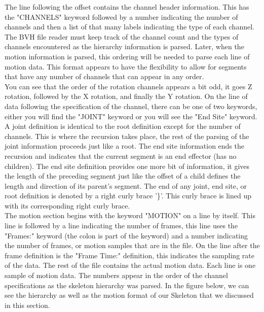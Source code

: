 The line following the offset contains the channel header information. This has the "CHANNELS" keyword followed by a number indicating the number of channels and then a list of that many labels indicating the type of each channel. The BVH file reader must keep track of the channel count and the types of channels encountered as the hierarchy information is parsed. Later, when the motion information is parsed, this ordering will be needed to parse each line of motion data. This format appears to have the flexibility to allow for segments that have any number of channels that can appear in any order.\\

You can see that the order of the rotation channels appears a bit odd, it goes Z rotation, followed by the X rotation, and finally the Y rotation. On the line of data following the specification of the channel, there can be one of two keywords, either you will find the "JOINT" keyword or you will see the "End Site" keyword. A joint definition is identical to the root definition except for the number of channels. This is where the recursion takes place, the rest of the parsing of the joint information proceeds just like a root. The end site information ends the recursion and indicates that the current segment is an end effector (has no children). The end site definition provides one more bit of information, it gives the length of the preceding segment just like the offset of a child defines the length and direction of its parent's segment. The end of any joint, end site, or root definition is denoted by a right curly brace '\}'. This curly brace is lined up with its corresponding right curly brace.\\

The motion section begins with the keyword "MOTION" on a line by itself. This line is followed by a line indicating the number of frames, this line uses the "Frames:" keyword (the colon is part of the keyword) and a number indicating the number of frames, or motion samples that are in the file. On the line after the frame definition is the "Frame Time:" definition, this indicates the sampling rate of the data. The rest of the file contains the actual motion data. Each line is one sample of motion data. The numbers appear in the order of the channel specifications as the skeleton hierarchy was parsed. In the figure below, we can see the hierarchy as well as the motion format of our Skeleton that we discussed in this section.

\pagebreak

